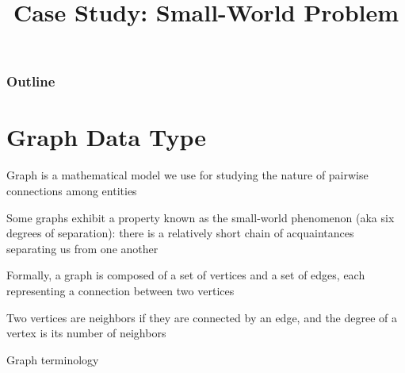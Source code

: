 \documentclass[8pt,a4paper,compress]{beamer}
\title{Case Study: Small-World Problem}
\date{}
\begin{document}
\begin{frame}
\vfill
\titlepage
\end{frame}

\begin{frame}
\frametitle{Outline}
\tableofcontents
\end{frame}

\section{Graph Data Type}
\begin{frame}[fragile]
\pause

Graph is a mathematical model we use for studying the nature of pairwise connections among entities

\pause
\bigskip

Some graphs exhibit a property known as the small-world phenomenon (aka six degrees of separation): there is a relatively short chain of acquaintances separating us from one another

\pause
\bigskip

Formally, a graph is composed of a set of vertices and a set of edges, each representing a connection between two vertices

\pause
\bigskip

Two vertices are neighbors if they are connected by an edge, and the degree of a vertex is its number of neighbors

\pause
\bigskip

Graph terminology
\begin{center}
\end{center}
\end{frame}
\end{document}
